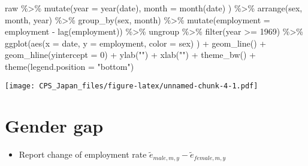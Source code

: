 \documentclass[
]{book}
\newenvironment{Shaded}{\begin{snugshade}}{\end{snugshade}}
\newcommand{\AttributeTok}[1]{\textcolor[rgb]{0.77,0.63,0.00}{#1}}
\newcommand{\DecValTok}[1]{\textcolor[rgb]{0.00,0.00,0.81}{#1}}
\newcommand{\FunctionTok}[1]{\textcolor[rgb]{0.00,0.00,0.00}{#1}}
\newcommand{\NormalTok}[1]{#1}
\newcommand{\SpecialCharTok}[1]{\textcolor[rgb]{0.00,0.00,0.00}{#1}}
\newcommand{\StringTok}[1]{\textcolor[rgb]{0.31,0.60,0.02}{#1}}
\providecommand{\tightlist}{%
  \setlength{\itemsep}{0pt}\setlength{\parskip}{0pt}}
\begin{document}
\begin{Shaded}
\begin{Highlighting}[]
\NormalTok{raw }\SpecialCharTok{\%\textgreater{}\%}
  \FunctionTok{mutate}\NormalTok{(}\AttributeTok{year =} \FunctionTok{year}\NormalTok{(date),}
         \AttributeTok{month =} \FunctionTok{month}\NormalTok{(date)}
\NormalTok{         ) }\SpecialCharTok{\%\textgreater{}\%}
  \FunctionTok{arrange}\NormalTok{(sex,}
\NormalTok{          month,}
\NormalTok{          year) }\SpecialCharTok{\%\textgreater{}\%}
  \FunctionTok{group\_by}\NormalTok{(sex,}
\NormalTok{           month) }\SpecialCharTok{\%\textgreater{}\%}
  \FunctionTok{mutate}\NormalTok{(}\AttributeTok{employment =}\NormalTok{ employment }\SpecialCharTok{{-}} \FunctionTok{lag}\NormalTok{(employment)) }\SpecialCharTok{\%\textgreater{}\%}
\NormalTok{  ungroup }\SpecialCharTok{\%\textgreater{}\%}
  \FunctionTok{filter}\NormalTok{(year }\SpecialCharTok{\textgreater{}=} \DecValTok{1969}\NormalTok{) }\SpecialCharTok{\%\textgreater{}\%}
  \FunctionTok{ggplot}\NormalTok{(}\FunctionTok{aes}\NormalTok{(}\AttributeTok{x =}\NormalTok{ date,}
             \AttributeTok{y =}\NormalTok{ employment,}
             \AttributeTok{color =}\NormalTok{ sex)}
\NormalTok{         ) }\SpecialCharTok{+}
  \FunctionTok{geom\_line}\NormalTok{() }\SpecialCharTok{+}
  \FunctionTok{geom\_hline}\NormalTok{(}\AttributeTok{yintercept =} \DecValTok{0}\NormalTok{) }\SpecialCharTok{+}
  \FunctionTok{ylab}\NormalTok{(}\StringTok{""}\NormalTok{) }\SpecialCharTok{+}
  \FunctionTok{xlab}\NormalTok{(}\StringTok{""}\NormalTok{) }\SpecialCharTok{+}
  \FunctionTok{theme\_bw}\NormalTok{() }\SpecialCharTok{+}
  \FunctionTok{theme}\NormalTok{(}\AttributeTok{legend.position =} \StringTok{"bottom"}\NormalTok{)}
\end{Highlighting}
\end{Shaded}

\texttt{[image: CPS\_Japan\_files/figure-latex/unnamed-chunk-4-1.pdf]}

\hypertarget{gender-gap}{%
\section{Gender gap}\label{gender-gap}}

\begin{itemize}
\tightlist
\item
  Report change of employment rate \(\tilde e_{male,m,y} - \tilde e_{female,m,y}\)
\end{itemize}
\end{document}
